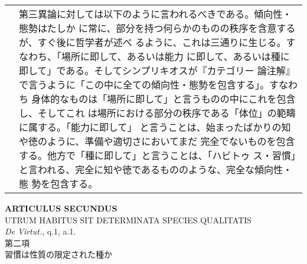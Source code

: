 \documentclass[10pt]{jsarticle} %
\begin{document}
\begin{longtable}{p{21em}p{21em}}
&

第三異論に対しては以下のように言われるべきである。傾向性・態勢はたしか
に常に、部分を持つ何らかのものの秩序を含意するが、すぐ後に哲学者が述べ
るように、これは三通りに生じる。すなわち、「場所に即して、あるいは能力
に即して、あるいは種に即して」である。そしてシンプリキオスが『カテゴリー
論注解』で言うように「この中に全ての傾向性・態勢を包含する」。すなわち
身体的なものは「場所に即して」と言うものの中にこれを包含し、そしてこれ
は場所における部分の秩序である「体位」の範疇に属する。「能力に即して」
と言うことは、始まったばかりの知や徳のように、準備や適切さにおいてまだ
完全でないものを包含する。他方で「種に即して」と言うことは、「ハビトゥ
ス・習慣」と言われる、完全に知や徳であるもののような、完全な傾向性・態
勢を包含する。


\\


\end{longtable}
\newpage


\begin{center}
{\Large {\bf ARTICULUS SECUNDUS}}\\
{\large UTRUM HABITUS SIT DETERMINATA SPECIES QUALITATIS}\\
{\footnotesize {\itshape De Virtut.}, q.1, a.1.}\\
{\Large 第二項\\習慣は性質の限定された種か}
\end{center}
\end{document}
